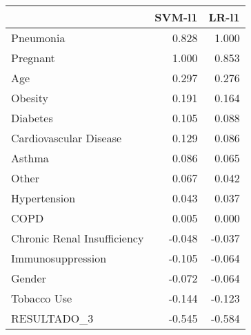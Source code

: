 \begin{tabular}{lrr}
\toprule
{} &  SVM-l1 &  LR-l1 \\
\midrule
Pneumonia                   &   0.828 &  1.000 \\
Pregnant                    &   1.000 &  0.853 \\
Age                         &   0.297 &  0.276 \\
Obesity                     &   0.191 &  0.164 \\
Diabetes                    &   0.105 &  0.088 \\
Cardiovascular Disease      &   0.129 &  0.086 \\
Asthma                      &   0.086 &  0.065 \\
Other                       &   0.067 &  0.042 \\
Hypertension                &   0.043 &  0.037 \\
COPD                        &   0.005 &  0.000 \\
Chronic Renal Insufficiency &  -0.048 & -0.037 \\
Immunosuppression           &  -0.105 & -0.064 \\
Gender                      &  -0.072 & -0.064 \\
Tobacco Use                 &  -0.144 & -0.123 \\
RESULTADO\_3                 &  -0.545 & -0.584 \\
\bottomrule
\end{tabular}
